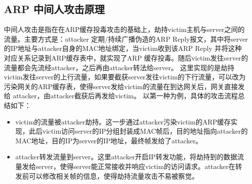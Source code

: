 \subsection{ARP 中间人攻击原理}
中间人攻击是指在在ARP缓存投毒攻击的基础上，劫持victim主机与server之间的流量。主要方式是：attacker
定期/持续广播伪造的ARP Reply报文，其中将server的IP地址与attacker自身的MAC地址绑定，当victim收到该ARP Reply
并将这种对应关系记录到ARP缓存表中，就实现了ARP 缓存投毒。随后victim发往server的流量都会先流经attacker，之后再由attacker转法给server。
这里实现的是劫持victim发往server的上行流量，如果要截获server发往victim的下行流量，可以改为污染网关的ARP缓存表，使得server发给victim的流量在到达网关后，网关直接发给
attacker，由attacker截获后再发给victim。
以第一种为例，具体的攻击流程总结如下：
\begin{itemize}
    \item[1] victim的流量被attacker劫持。这一步通过attacker污染victim的ARP缓存实现，此后victim访问server的IP分组封装成MAC帧后，目的地址指向attacker的MAC地址，目的IP为server的IP地址，最终帧发给了attacker。
    \item[2] attacker转发流量到server。这里attacker开启IP转发功能，将劫持到的数据流量发给server，使得server能正常接收并响应victim的访问请求。attacker在转发前可以修改相关帧的信息，使得劫持流量攻击不易被察觉。
\end{itemize}